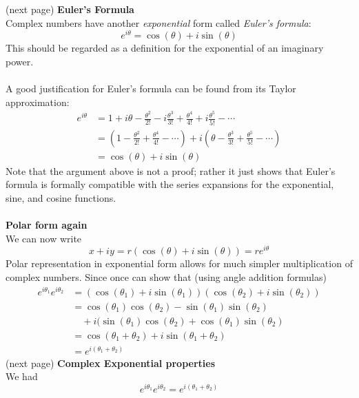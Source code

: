 \documentclass{report}
\begin{document}
(next page)
\newpage
\noindent\textbf{Euler's Formula}\\
Complex numbers have another \textit{exponential} form called \textit{Euler's formula}:
\begin{equation*}
e^{i\theta}=\cos(\theta)+i\sin(\theta)
\end{equation*}
This should be regarded as a definition for the exponential of an imaginary power.\\
\vspace{1mm}\\
A good justification for Euler's formula can be found from
its Taylor approximation:
\begin{align*}
e^{i\theta}&=1+i\theta-\frac{\theta^2}{2!}-i\frac{\theta^3}{3!}+\frac{\theta^4}{4!}+i\frac{\theta^5}{5!}-\cdots\\
&=\left(1-\frac{\theta^2}{2!}+\frac{\theta^4}{4!}-\cdots\right)+i\left(\theta-\frac{\theta^3}{3!}
+\frac{\theta^5}{5!}-\cdots\right)\\
&=\cos(\theta)+i\sin(\theta)
\end{align*}
Note that the argument above is not a proof; rather it just shows that Euler's formula is formally compatible with
the series expansions for the exponential, sine, and cosine functions.\\
\vspace{1mm}\\
\textbf{Polar form again}\\
We can now write
\begin{equation*}
x+iy=r(\cos(\theta)+i\sin(\theta))=re^{i\theta}
\end{equation*}
Polar representation in exponential form allows for much simpler multiplication of complex numbers. Since once can
show that (using angle addition formulas)
\begin{align*}
e^{i\theta_1}e^{i\theta_2}&=(\cos(\theta_1)+i\sin(\theta_1))(\cos(\theta_2)+i\sin(\theta_2))\\
&=\cos(\theta_1)\cos(\theta_2)-\sin(\theta_1)\sin(\theta_2)\\&\quad+i(\sin(\theta_1)\cos(\theta_2)+\cos(\theta_1)\sin(\theta_2)\\
&=\cos(\theta_1+\theta_2)+i\sin(\theta_1+\theta_2)\\
&=e^{i(\theta_1+\theta_2)}
\end{align*}
(next page)
\newpage
\noindent\textbf{Complex Exponential properties}\\
We had
\begin{equation*}
e^{i\theta_1}e^{i\theta_2}=e^{i(\theta_1+\theta_2)}
\end{equation*}
\end{document}
